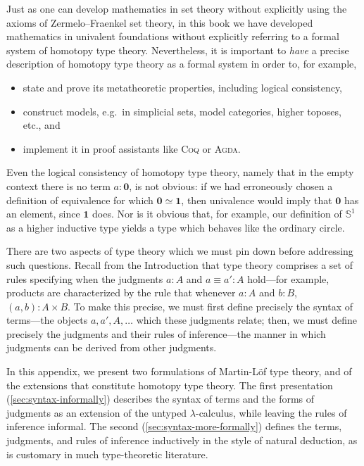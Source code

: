 \documentclass[12pt]{article}
\newcommand{\Agda}{\textsc{Agda}\xspace}
\newcommand{\Coq}{\textsc{Coq}\xspace}
\newcommand{\emptyt}{\ensuremath{\mathbf{0}}\xspace}
\newcommand{\eqv}[2]{\ensuremath{#1 \simeq #2}\xspace}
\newcommand{\jdeq}{\equiv}
\newcommand{\Sn}{\mathbb{S}}
\newcommand{\unit}{\ensuremath{\mathbf{1}}\xspace}
\let\autoref\cref
\begin{document}
%
%
%

Just as one can develop mathematics in set theory without explicitly using the axioms of Zermelo--Fraenkel set theory, 
in this book we have developed mathematics in univalent foundations without explicitly referring to a formal
system of homotopy type theory. Nevertheless, it is important to \emph{have} a
precise description of homotopy type theory as a formal system in order to, for example,
%
\begin{itemize}
\item state and prove its metatheoretic properties, including logical
consistency,
\item construct models, e.g.\  in simplicial sets, model categories, higher toposes,
etc., and
\item implement it in proof assistants like \Coq or \Agda.
\end{itemize}
%
Even the logical consistency of homotopy type theory, namely that in the empty context there is no term $a:\emptyt$, is not obvious: if we had erroneously
chosen a definition of equivalence for which $\eqv{\emptyt}{\unit}$, then
univalence would imply that $\emptyt$ has an element, since $\unit$ does.
Nor is it obvious that, for example, our definition of $\Sn^1$ as a higher
inductive type yields a type which behaves like the ordinary circle.

There are two aspects of type theory which we must pin down before addressing
such questions. Recall from the Introduction that type theory
comprises a set of rules specifying when the judgments $a:A$ and $a\jdeq a':A$
hold---for example, products are characterized by the rule that whenever $a:A$
and $b:B$, $(a,b):A\times B$. To make this precise, we must first define
precisely the syntax of terms---the objects $a,a',A,\dots$ which these judgments
relate; then, we must define precisely the judgments and their rules of
inference---the manner in which judgments can be derived from other judgments.

In this appendix, we present two formulations of Martin-L\"{o}f type
theory, and of the extensions that constitute homotopy type theory.
The first presentation (\autoref{sec:syntax-informally}) describes the syntax of
terms and the forms of judgments as an extension of the untyped
$\lambda$-calculus, while leaving the rules of inference informal.
The second (\autoref{sec:syntax-more-formally}) defines the terms, judgments,
and rules of inference inductively in the style of natural deduction, as
is customary in much type-theoretic literature.
\end{document}
